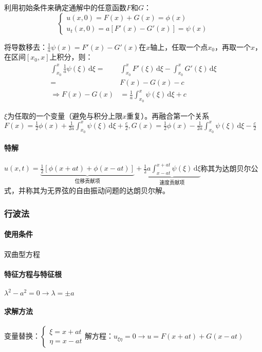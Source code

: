 利用初始条件来确定通解中的任意函数\(F\)和\(G\)：
\[
\begin{cases}u(x,0)=F(x)+G(x)=\phi(x)\\u_t(x,0)=a\left[F'(x)-G'(x)\right]=\psi(x)\end{cases}
\]

将导数移去：\(\frac{1}{a}\psi(x)=F'(x)-G'(x)\)在\(x\)轴上，任取一个点\(x_0\)，再取一个\(x\)，在区间\([x_0,x]\)上积分，则：
\begin{align*}
\int_{x_0}^{x}{\frac{1}{a}\psi(\xi)\,\mathrm{d}\xi}=&\int_{x_0}^{x}{F'(\xi)\,\mathrm{d}\xi}-\int_{x_0}^{x}{G'(\xi)\,\mathrm{d}\xi}\\
=&F(x)-G(x)-c\\
\Rightarrow F(x)-G(x)&=\frac{1}{a}\int_{x_0}^{x}\psi(\xi)\,\mathrm{d}\xi+c	
\end{align*}

\(\xi\)为任取的一个变量（避免与积分上限\(x\)重复）。再融合第一个关系\(F(x)=\frac{1}{2}\phi(x)+\frac{1}{2a}\int_{x_0}^{x}\psi(\xi)\,\mathrm{d}\xi+\frac{c}{2},G(x)=\frac{1}{2}\phi(x)-\frac{1}{2a}\int_{x_0}^{x}\psi(\xi)\,\mathrm{d}\xi-\frac{c}{2}\)

\paragraph{特解}\(u(x,t)=\underbrace{\frac{1}{2}[\phi(x+at)+\phi(x-at)]}_\text{位移贡献项}+\underbrace{\frac{1}{2}a\int_{x-at}^{x+at}\psi(\xi)\,\mathrm{d}\xi}_\text{速度贡献项}\)称其为达朗贝尔公式，并称其为无界弦的自由振动问题的达朗贝尔解。

\subsubsection{行波法}

\paragraph{使用条件}双曲型方程

\paragraph{特征方程与特征根}\(\lambda^2-a^2=0\rightarrow\lambda=\pm a\)

\paragraph{求解方法}变量替换：\(\begin{cases}\xi=x+at\\\eta=x-at\end{cases}\)解方程：\(u_{\xi\eta}=0\rightarrow u=F(x+at)+G(x-at)\)

